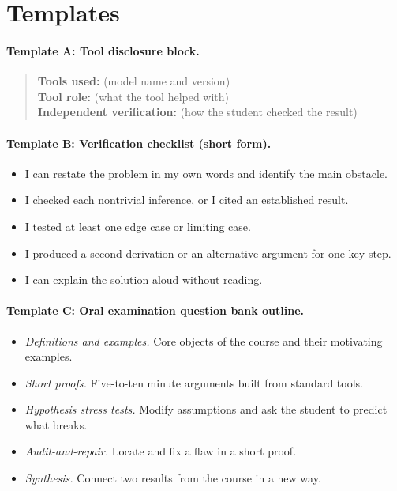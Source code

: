 \documentclass{SIAMbook2023}
\begin{document}
\section{Templates}

\paragraph{Template A: Tool disclosure block.}

\begin{quote}
\textbf{Tools used:} (model name and version)\\
\textbf{Tool role:} (what the tool helped with)\\
\textbf{Independent verification:} (how the student checked the result)
\end{quote}

\paragraph{Template B: Verification checklist (short form).}

\begin{itemize}[label=$\square$]
\item I can restate the problem in my own words and identify the main obstacle.
\item I checked each nontrivial inference, or I cited an established result.
\item I tested at least one edge case or limiting case.
\item I produced a second derivation or an alternative argument for one key step.
\item I can explain the solution aloud without reading.
\end{itemize}

\paragraph{Template C: Oral examination question bank outline.}

\begin{itemize}
\item \textit{Definitions and examples.} Core objects of the course and their motivating examples.
\item \textit{Short proofs.} Five-to-ten minute arguments built from standard tools.
\item \textit{Hypothesis stress tests.} Modify assumptions and ask the student to predict what breaks.
\item \textit{Audit-and-repair.} Locate and fix a flaw in a short proof.
\item \textit{Synthesis.} Connect two results from the course in a new way.
\end{itemize}
\end{document}

